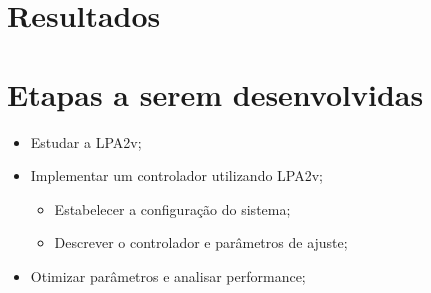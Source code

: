 \newpage


\section{Resultados}






\section{Etapas a serem desenvolvidas}

\begin{itemize}
\item Estudar a LPA2v;
\item Implementar um controlador utilizando LPA2v;
	\begin{itemize}
	\item Estabelecer a configuração do sistema;
	\item Descrever o controlador e parâmetros de ajuste;
	\end{itemize}
\item Otimizar parâmetros e analisar performance;
\end{itemize}


